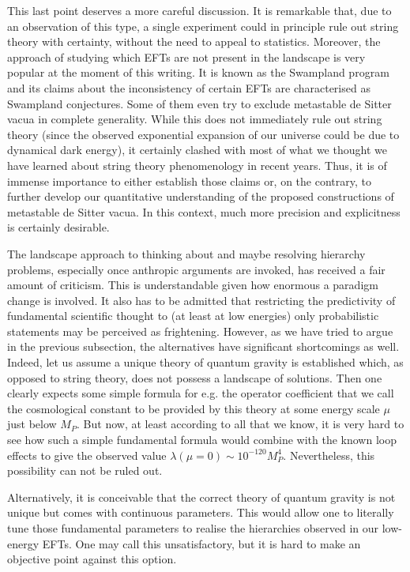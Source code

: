\documentclass[12pt]{article}
\numberwithin{equation}{section}
\begin{document}
This last point deserves a more careful discussion. It is remarkable that, due to an observation of this type, a single experiment could in principle rule out string theory with certainty, without the need to appeal to statistics. Moreover, the approach of studying which EFTs are not present in the landscape is very popular at the moment of this writing. It is known as the Swampland program and its claims about the inconsistency of certain EFTs are characterised as Swampland conjectures. Some of them even try to exclude metastable de Sitter vacua in complete generality. While this does not immediately rule out string theory (since the observed exponential expansion of our  universe could be due to dynamical dark energy), it certainly clashed with most of what we thought we have learned about string theory phenomenology in recent years. Thus, it is of immense importance to either establish those claims or, on the contrary, to further develop our quantitative understanding of the proposed constructions of metastable de Sitter vacua. In this context, much more precision and explicitness is certainly desirable.

The landscape approach to thinking about and maybe resolving hierarchy problems, especially once anthropic arguments are invoked, has received a fair amount of criticism. This is understandable given how enormous a paradigm change is involved. It also has to be admitted that restricting the predictivity of fundamental scientific thought to (at least at low energies) only probabilistic statements may be perceived as frightening. However, as we have tried to argue in the previous subsection, the alternatives have significant shortcomings as well. Indeed, let us assume a unique theory of quantum gravity is established which, as opposed to string theory, does not possess a landscape of solutions. Then one clearly expects some simple formula for e.g. the operator coefficient that we call the cosmological constant to be provided by this theory at some energy scale $\mu$ just below $M_P$. But now, at least according to all that we know, it is very hard to see how such a simple fundamental formula would combine with the known loop effects to give the observed value $\lambda(\mu=0)\sim 10^{-120} M_P^4$. Nevertheless, this possibility can not be ruled out.

Alternatively, it is conceivable that the correct theory of quantum gravity is not unique but comes with continuous parameters. This would allow one to literally tune those fundamental parameters to realise the hierarchies observed in our low-energy EFTs. One may call this unsatisfactory, but it is hard to make an objective point against this option.
\end{document}
